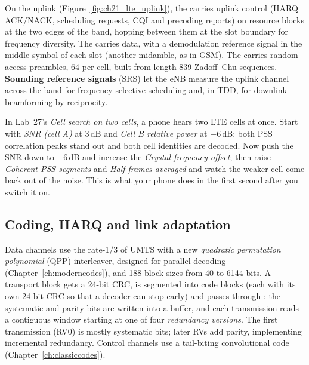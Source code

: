 On the uplink (Figure~\ref{fig:ch21_lte_uplink}), the  carries uplink control (HARQ ACK/NACK, scheduling requests, CQI and
precoding reports) on resource blocks at the two edges of the band, hopping between them at the slot
boundary for frequency diversity. The  carries data, with a demodulation reference signal
in the middle symbol of each slot (another midamble, as in GSM). The  carries
random-access preambles, 64 per cell, built from length-839 Zadoff--Chu sequences.
\textbf{Sounding reference signals} (SRS) let the eNB measure the
uplink channel across the band for frequency-selective scheduling and, in TDD, for downlink
beamforming by reciprocity.

\begin{tryit}
In Lab~27's \emph{Cell search on two cells}, a phone hears two LTE cells at once. Start with
\emph{SNR (cell A)} at 3\,dB and \emph{Cell B relative power} at $-6$\,dB: both PSS correlation peaks
stand out and both cell identities are decoded. Now push the SNR down to $-6$\,dB and increase the
\emph{Crystal frequency offset}; then raise \emph{Coherent PSS segments} and \emph{Half-frames
averaged} and watch the weaker cell come back out of the noise. This is what your phone does in the
first second after you switch it on.
\end{tryit}


\subsection{Coding, HARQ and link adaptation}

Data channels use the rate-1/3  of UMTS with a new \emph{quadratic permutation
polynomial} (QPP) interleaver, designed for parallel decoding (Chapter~\ref{ch:moderncodes}), and 188
block sizes from 40 to 6144 bits. A transport block gets a 24-bit CRC, is segmented into code blocks
(each with its own 24-bit CRC so that a decoder can stop early) and passes through
: the systematic and parity bits are written into a buffer, and
each transmission reads a contiguous window starting at one of four \emph{redundancy versions}. The
first transmission (RV0) is mostly systematic bits; later RVs add parity, implementing incremental
redundancy. Control channels use a tail-biting convolutional code (Chapter~\ref{ch:classiccodes}).

